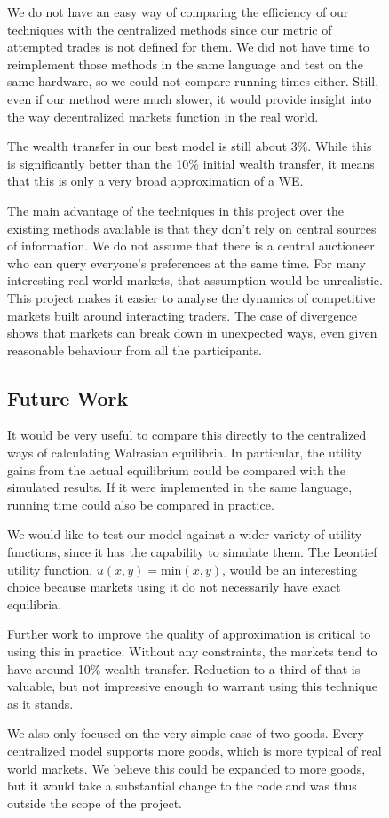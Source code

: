 \documentclass[12pt,a4paper,titlepage]{article}
\begin{document}
\begin{figure}[H]
We do not have an easy way of comparing the efficiency of our techniques with the centralized methods since our metric of attempted trades is not defined for them.
We did not have time to reimplement those methods in the same language and test on the same hardware, so we could not compare running times either.
Still, even if our method were much slower, it would provide insight into the way decentralized markets function in the real world.

The wealth transfer in our best model is still about 3\%.
While this is significantly better than the 10\% initial wealth transfer, it means that this is only a very broad approximation of a WE.

The main advantage of the techniques in this project over the existing methods available is that they don't rely on central sources of information.
We do not assume that there is a central auctioneer who can query everyone's preferences at the same time.
For many interesting real-world markets, that assumption would be unrealistic.
This project makes it easier to analyse the dynamics of competitive markets built around interacting traders.
The case of divergence shows that markets can break down in unexpected ways, even given reasonable behaviour from all the participants.

\subsection{Future Work}
It would be very useful to compare this directly to the centralized ways of calculating Walrasian equilibria.
In particular, the utility gains from the actual equilibrium could be compared with the simulated results.
If it were implemented in the same language, running time could also be compared in practice.

We would like to test our model against a wider variety of utility functions, since it has the capability to simulate them.
The Leontief utility function, $u(x,y) = \mathrm{min}(x, y)$, would be an interesting choice because markets using it do not necessarily have exact equilibria.

Further work to improve the quality of approximation is critical to using this in practice.
Without any constraints, the markets tend to have around 10\% wealth transfer. 
Reduction to a third of that is valuable, but not impressive enough to warrant using this technique as it stands.

We also only focused on the very simple case of two goods.
Every centralized model supports more goods, which is more typical of real world markets.
We believe this could be expanded to more goods, but it would take a substantial change to the code and was thus outside the scope of the project.


\end{figure}
\end{document}
